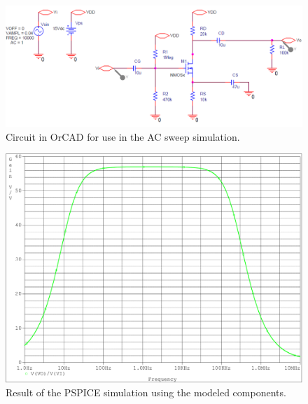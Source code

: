 \documentclass{report}
\begin{document}
\vspace{-1em}
\begin{figure}[H]
	\centering
	\includegraphics[width=0.8\linewidth]{exp1pspiceckt}
	\caption{Circuit in OrCAD for use in the AC sweep simulation.}
	\label{fig:exp1pspiceckt}
\end{figure}
\vspace{-1em}
\begin{figure}[H]
	\centering
	\includegraphics[width=0.7\linewidth]{exp1spice}
	\caption{Result of the PSPICE simulation using the modeled components.}
	\label{fig:exp1spice}
\end{figure}
\end{document}
